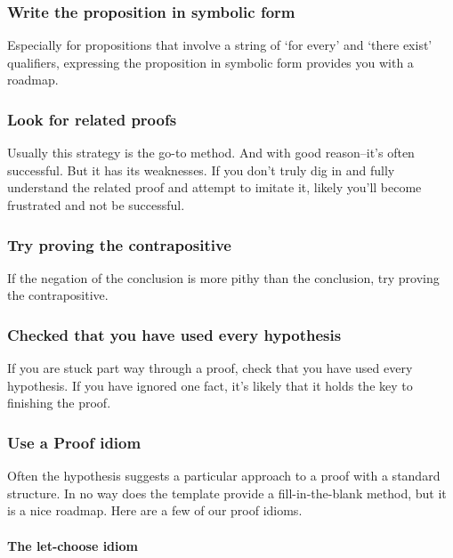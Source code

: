 \documentclass[12pt,fleqn]{article}
\newcounter{ex}\setcounter{ex}{0}
\newcounter{id}\setcounter{id}{0}
\newcounter{se}\setcounter{se}{0}
\begin{document}
 \subsubsection{Write the proposition in symbolic form} 
 
 Especially for propositions 
 that involve a string of `for every' and `there exist' qualifiers,
 expressing the proposition in symbolic form provides you with 
 a roadmap.

 \subsubsection{Look for related proofs} 
 
 Usually this strategy is the go-to 
 method. And with good reason--it's often successful. But it has its 
 weaknesses. If you don't truly dig in and fully understand the related
 proof and attempt to imitate it, likely you'll become frustrated and 
 not be successful. 

 \subsubsection{Try proving the contrapositive} 
 
 If the negation of the conclusion is 
 more pithy than the conclusion, try proving the contrapositive.


 \subsubsection{Checked that you have used every hypothesis}

 If you are stuck part way through a proof, check that you have
 used every hypothesis.  If you have ignored one fact,  it's likely
 that it holds the key to finishing the proof.
 
 

\subsubsection{Use a  Proof idiom}

Often the hypothesis suggests a particular approach to a proof with a standard structure.  In no way does
the template provide a fill-in-the-blank method, but it is a nice roadmap.  
Here are a few of our proof idioms.

\paragraph{The let-choose idiom}
\end{document}
